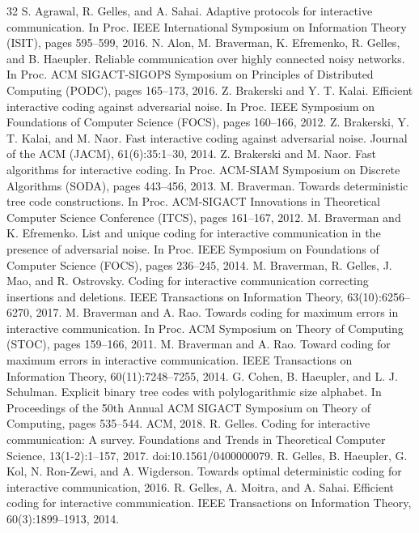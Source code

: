 \documentclass[10pt,a4paper]{article}
\begin{document}
\begin{thebibliography}{32}
 S. Agrawal, R. Gelles, and A. Sahai. Adaptive protocols for interactive communication. In Proc. IEEE International Symposium on Information Theory (ISIT), pages 595–599, 2016.
 N. Alon, M. Braverman, K. Efremenko, R. Gelles, and B. Haeupler. Reliable communication over highly connected noisy networks. In Proc. ACM SIGACT-SIGOPS Symposium on Principles of Distributed Computing (PODC), pages 165–173, 2016.
 Z. Brakerski and Y. T. Kalai. Efficient interactive coding against adversarial noise. In Proc. IEEE Symposium on Foundations of Computer Science (FOCS), pages 160–166, 2012.
 Z. Brakerski, Y. T. Kalai, and M. Naor. Fast interactive coding against adversarial noise. Journal of the ACM (JACM), 61(6):35:1–30, 2014.
 Z. Brakerski and M. Naor. Fast algorithms for interactive coding. In Proc. ACM-SIAM Symposium on Discrete Algorithms (SODA), pages 443–456, 2013.
 M. Braverman. Towards deterministic tree code constructions. In Proc. ACM-SIGACT Innovations in Theoretical Computer Science Conference (ITCS), pages 161–167, 2012.
 M. Braverman and K. Efremenko. List and unique coding for interactive communication in the presence of adversarial noise. In Proc. IEEE Symposium on Foundations of Computer Science (FOCS), pages 236–245, 2014.
 M. Braverman, R. Gelles, J. Mao, and R. Ostrovsky. Coding for interactive communication correcting insertions and deletions. IEEE Transactions on Information Theory, 63(10):6256– 6270, 2017.
 M. Braverman and A. Rao. Towards coding for maximum errors in interactive communication. In Proc. ACM Symposium on Theory of Computing (STOC), pages 159–166, 2011.
 M. Braverman and A. Rao. Toward coding for maximum errors in interactive communication. IEEE Transactions on Information Theory, 60(11):7248–7255, 2014.
 G. Cohen, B. Haeupler, and L. J. Schulman. Explicit binary tree codes with polylogarithmic size alphabet. In Proceedings of the 50th Annual ACM SIGACT Symposium on Theory of Computing, pages 535–544. ACM, 2018.
 R. Gelles. Coding for interactive communication: A survey. Foundations and Trends in Theoretical Computer Science, 13(1-2):1–157, 2017. doi:10.1561/0400000079.
 R. Gelles, B. Haeupler, G. Kol, N. Ron-Zewi, and A. Wigderson. Towards optimal deterministic coding for interactive communication, 2016.
 R. Gelles, A. Moitra, and A. Sahai. Efficient coding for interactive communication. IEEE Transactions on Information Theory, 60(3):1899–1913, 2014.

\end{thebibliography}
\end{document}
